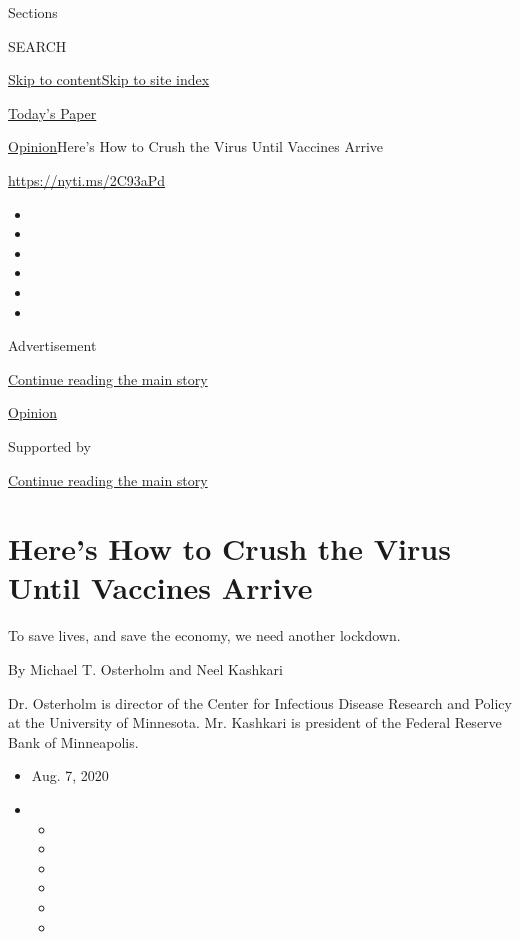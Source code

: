 Sections

SEARCH

\protect\hyperlink{site-content}{Skip to
content}\protect\hyperlink{site-index}{Skip to site index}

\href{https://myaccount.nytimes3xbfgragh.onion/auth/login?response_type=cookie\&client_id=vi}{}

\href{https://www.nytimes3xbfgragh.onion/section/todayspaper}{Today's
Paper}

\href{/section/opinion}{Opinion}\textbar{}Here's How to Crush the Virus
Until Vaccines Arrive

\url{https://nyti.ms/2C93aPd}

\begin{itemize}
\item
\item
\item
\item
\item
\item
\end{itemize}

Advertisement

\protect\hyperlink{after-top}{Continue reading the main story}

\href{/section/opinion}{Opinion}

Supported by

\protect\hyperlink{after-sponsor}{Continue reading the main story}

\hypertarget{heres-how-to-crush-the-virus-until-vaccines-arrive}{%
\section{Here's How to Crush the Virus Until Vaccines
Arrive}\label{heres-how-to-crush-the-virus-until-vaccines-arrive}}

To save lives, and save the economy, we need another lockdown.

By Michael T. Osterholm and Neel Kashkari

Dr. Osterholm is director of the Center for Infectious Disease Research
and Policy at the University of Minnesota. Mr. Kashkari is president of
the Federal Reserve Bank of Minneapolis.

\begin{itemize}
\item
  Aug. 7, 2020
\item
  \begin{itemize}
  \item
  \item
  \item
  \item
  \item
  \item
  \end{itemize}
\end{itemize}

